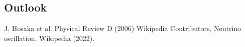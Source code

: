 \documentclass[12pt]{article}
\begin{document}
\begin{multicols}{2}

\section{Outlook}


\begin{thebibliography}{1}

	
     J. Hosaka et al. Physical Review D (2006)
     Wikipedia Contributors, Neutrino oscillation, Wikipedia (2022).
        
    
\end{thebibliography}

    
\end{multicols}
\end{document}

